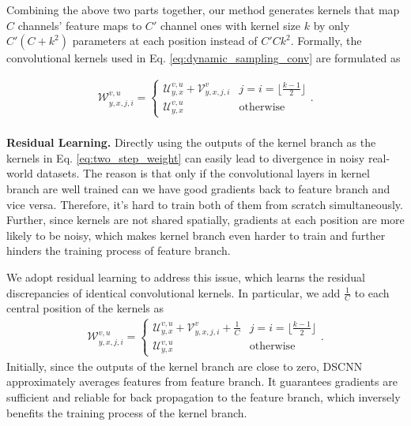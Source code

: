\documentclass[runningheads]{llncs}
\begin{document}
Combining the above two parts together, our method generates kernels that map $C$ channels' feature maps to $C'$ channel ones with kernel size $k$ by only $C'(C+k^2)$ parameters at each position instead of $C'Ck^2$. 
Formally, the convolutional kernels used in Eq. \ref{eq:dynamic_sampling_conv} are formulated as

\begin{align}
\mathcal{W}^{v,u}_{y,x,j,i} =
    \begin{cases}
      \mathcal{U}^{v,u}_{y,x} + \mathcal{V}^{v}_{y,x,j,i}  
      & \text{$j=i=\lfloor \frac{k-1}{2} \rfloor$}
    \\[4pt]
      \mathcal{U}^{v,u}_{y,x}   & \text{otherwise}
    \end{cases}.
    \label{eq:two_step_weight}
\end{align} \\

\noindent\textbf{Residual Learning.}
Directly using the outputs of the kernel branch as the kernels in Eq. \ref{eq:two_step_weight} can easily lead to divergence in noisy real-world datasets. The reason is that only if the convolutional layers in kernel branch are well trained can we have good gradients back to feature branch and vice versa. Therefore, it's hard to train both of them from scratch simultaneously. Further, since kernels are not shared spatially, gradients at each position are more likely to be noisy, which makes kernel branch even harder to train and further hinders the training process of feature branch. 

We adopt residual learning to address this issue, which learns the residual discrepancies of identical convolutional kernels. In particular, we add $\frac{1}{C}$ to each central position of the kernels as 
\begin{align}
\mathcal{W}^{v,u}_{y,x,j,i} =
    \begin{cases}
      \mathcal{U}^{v,u}_{y,x} + \mathcal{V}^{v}_{y,x,j,i} +
      \frac{1}{C}
      & \text{$j=i=\lfloor \frac{k-1}{2} \rfloor$}
    \\[4pt]
      \mathcal{U}^{v,u}_{y,x}   & \text{otherwise}
    \end{cases}.
    \label{eq:two_step_weight_residual}
\end{align}
Initially, since the outputs of the kernel branch are close to zero, DSCNN approximately averages features from feature branch. 
It guarantees gradients are sufficient and reliable for back propagation to the feature branch, which inversely benefits the training process of the kernel branch. 
\end{document}

